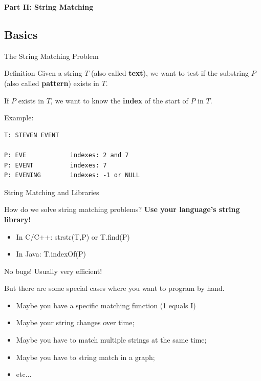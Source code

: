 \begin{frame}
  \begin{center}
    {\bf Part II: String Matching}
  \end{center}
\end{frame}

\subsection{Basics}

\begin{frame}[fragile]{The String Matching Problem}
  \begin{block}{Definition}
    Given a string $T$ (also called {\bf text}), we want to test if the substring $P$ (also called {\bf pattern}) exists in $T$.
    \bigskip

    If $P$ exists in $T$, we want to know the {\bf index} of the start of $P$ in $T$.
  \end{block}\bigskip

  Example:
\begin{verbatim}
T: STEVEN EVENT

P: EVE            indexes: 2 and 7
P: EVENT          indexes: 7
P: EVENING        indexes: -1 or NULL
\end{verbatim}
\end{frame}

\begin{frame}{String Matching and Libraries}

  \begin{block}{How do we solve string matching problems?}
    {\bf Use your language's string library!}
    \begin{itemize}
      \item In C/C++: strstr(T,P) or T.find(P)
      \item In Java: T.indexOf(P)
    \end{itemize}\bigskip

    No bugs! Usually very efficient!
  \end{block}\bigskip

  But there are some special cases where you want to program by hand.
  \begin{itemize}
    \item Maybe you have a specific matching function (1 equals I)
    \item Maybe your string changes over time;
    \item Maybe you have to match multiple strings at the same time;
    \item Maybe you have to string match in a graph;
    \item etc...
  \end{itemize}\bigskip
\end{frame}

